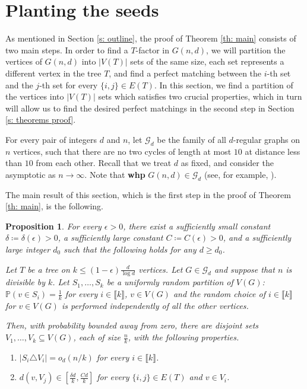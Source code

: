 \documentclass[notitlepage]{scrartcl}
\newcommand{\br}[1]{\llbracket{#1}\rrbracket}
\newtheorem{proposition}[thm]{Proposition}
\begin{document}
\section{Planting the seeds}\label{s: proposition}
As mentioned in Section \ref{s: outline}, the proof of Theorem \ref{th: main} consists of two main steps. In order to find a $T$-factor in $G(n, d)$, we will partition the vertices of $G(n, d)$ into $|V(T)|$ sets of the same size, each set represents a different vertex in the tree $T$, and find a perfect matching between the $i$-th set and the $j$-th set for every $\{i, j\} \in E(T)$. In this section, we find a partition of the vertices into $|V(T)|$ sets which satisfies two crucial properties, which in turn will allow us to find the desired perfect matchings in the second step in Section \ref{s: theorems proof}.


For every pair of integers $d$ and $n$, let $\mathcal{G}_d$ be the family of all $d$-regular graphs on $n$ vertices, such that there are no two cycles of length at most $10$ at distance less than $10$ from each other. Recall that we treat $d$ as fixed, and consider the asymptotic as $n\to\infty$. Note that \textbf{whp} $G(n,d)\in \mathcal{G}_d$ (see, for example, \cite{W99}). 

The main result of this section, which is the first step in the proof of Theorem \ref{th: main}, is the following.
\begin{proposition}\label{prop: main path}
For every $\epsilon > 0$, there exist a sufficiently small constant $\delta\coloneqq \delta(\epsilon)>0$, a sufficiently large constant $C\coloneqq C(\epsilon)>0$, and a sufficiently large integer $d_0$ such that the following holds for any $d\ge d_0$. 

Let $T$ be a tree on $k \le (1-\epsilon) \frac{d}{\log d}$ vertices. Let $G\in \mathcal{G}_d$ and suppose that $n$ is divisible by $k$. Let $S_1,\ldots, S_k$ be a uniformly random partition of $V(G)$: $\mathbb{P}\left(v\in S_i\right)= \frac{1}{k}$ for every $i\in \br{k}$, $v\in V(G)$ and the random choice of $i\in\br{k}$ for $v\in V(G)$ is performed independently of all the other vertices.

Then, with probability bounded away from zero, there are disjoint sets $V_1,\ldots, V_k\subseteq V(G)$, each of size $\frac{n}{k}$, with the following properties.
\begin{enumerate}[(P\arabic*{})]
    \item $|S_i\triangle V_i|=o_d(n/k)$ for every $i\in \br{k}$. \label{p: close to uniform}
    \item $d(v,V_j)\in \left[\frac{\delta d}{k},\frac{Cd}{k}\right]$ for every $\{i, j\} \in E(T)$ and $v \in V_i$. \label{p: good degree between}
\end{enumerate}
\end{proposition}
\end{document}
